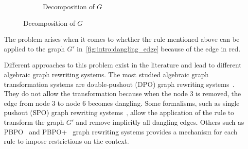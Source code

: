 \begin{figure}[htbp]
\begin{subfigure}{0.3\textwidth}
  \caption{Decomposition of $G$}
  \label{fig:intro:decomposition_of_G}
\end{subfigure}

\end{figure}
The problem arises when it comes to whether the rule mentioned above can be applied to the graph $G'$ in~\autoref{fig:intro:dangling_edge} because of the edge in red.
\begin{figure}[htbp]
   \centering
  \caption{}
  \label{fig:intro:dangling_edge}
\end{figure}

Different approaches to this problem exist in the literature and lead to different algebraic graph rewriting systems.   
The most studied algebraic graph transformation systems are double-pushout (DPO) graph rewriting systems~\cite{corradini1997algebraic,habel2001double}. They do not allow the transformation because when the node 3 is removed, the edge from node 3 to node 6 becomes dangling. Some formalisms, such as single pushout (SPO) graph rewriting systems~\cite{ehrig1997algebraic}, allow the application of the rule to transform the graph $G'$ and remove implicitly all dangling edges. Others such as PBPO~\cite{corradini2019thepbpo} and PBPO+~\cite{overbeek2023graph} graph rewriting systems provides a mechanism for each rule to impose restrictions on the context. 

